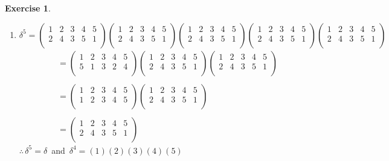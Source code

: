 \documentclass[11pt,a4paper]{article}
\theoremstyle{definition}
\newtheorem{exe}[thm]{Exercise}
\begin{document}
\begin{exe}
\begin{enumerate}
\item[(c)] $\delta^5 = \begin{pmatrix}
1 & 2 & 3 & 4 & 5\\
2 & 4 & 3 & 5 & 1\\ 
\end{pmatrix}\begin{pmatrix}
1 & 2 & 3 & 4 & 5\\
2 & 4 & 3 & 5 & 1\\ 
\end{pmatrix}\begin{pmatrix}
1 & 2 & 3 & 4 & 5\\
2 & 4 & 3 & 5 & 1\\ 
\end{pmatrix}\begin{pmatrix}
1 & 2 & 3 & 4 & 5\\
2 & 4 & 3 & 5 & 1\\ 
\end{pmatrix}\begin{pmatrix}
1 & 2 & 3 & 4 & 5\\
2 & 4 & 3 & 5 & 1\\ 
\end{pmatrix}$
\begin{align*}
& = \begin{pmatrix}
1 & 2 & 3 & 4 & 5\\
5 & 1 & 3 & 2 & 4\\
\end{pmatrix}\begin{pmatrix}
1 & 2 & 3 & 4 & 5\\
2 & 4 & 3 & 5 & 1\\
\end{pmatrix}\begin{pmatrix}
1 & 2 & 3 & 4 & 5\\
2 & 4 & 3 & 5 & 1\\ 
\end{pmatrix}\\\\
& = \begin{pmatrix}
1 & 2 & 3 & 4 & 5\\
1 & 2 & 3 & 4 & 5\\
\end{pmatrix}\begin{pmatrix}
1 & 2 & 3 & 4 & 5\\
2 & 4 & 3 & 5 & 1\\ 
\end{pmatrix}\\\\
& = \begin{pmatrix}
1 & 2 & 3 & 4 & 5\\
2 & 4 & 3 & 5 & 1\\
\end{pmatrix}
\end{align*}
$\therefore\, \delta^5 = \delta\,$ and $\, \delta^4 = (1)(2)(3)(4)(5)$\\\\




\end{enumerate}
\end{exe}
\end{document}
